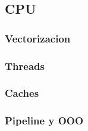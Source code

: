 \subsection {CPU}
\subsubsection{Vectorizacion}
\subsubsection{Threads}
\subsubsection{Caches}
\subsubsection{Pipeline y OOO}
